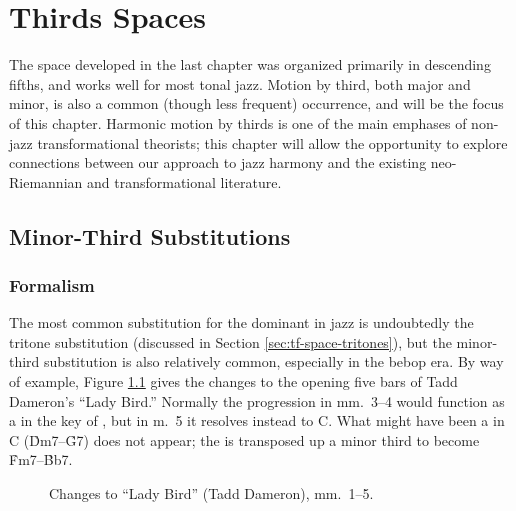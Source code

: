 
\chapter{Thirds Spaces}
\label{chap:thirds-spaces}
\addtocspace

The space developed in the last chapter was organized primarily in descending
fifths, and works well for most tonal jazz. Motion by third, both major and
minor, is also a common (though less frequent) occurrence, and will be the
focus of this chapter. Harmonic motion by thirds is one of the main
emphases of non-jazz transformational theorists; this chapter will allow the
opportunity to explore connections between our approach to jazz harmony and
the existing neo-Riemannian and transformational literature.

\section{Minor-Third Substitutions}
\label{sec:minor-third-subst}

\subsection{Formalism}
\label{sec:m3-formalism}

The most common substitution for the dominant in jazz is undoubtedly the
tritone substitution (discussed in Section \ref{sec:tf-space-tritones}), but
the minor-third substitution is also relatively common, especially in the
bebop era. By way of example, Figure \ref{mts:ladybird-changes} gives the
changes to the opening five bars of Tadd Dameron's ``Lady Bird.'' Normally the
progression in mm.~3--4 would function as a \tf in the key of \Eflat, but in
m.~5 it resolves instead to C. What might have been a \tfo in C
(\h{Dm7}--\h{G7}) does not appear; the \tf is transposed up a minor third to
become \h{Fm7}--\h{Bb7}.

\begin{figure}[tbp]
  \caption{Changes to ``Lady Bird'' (Tadd Dameron), mm.~1--5.}
  \label{mts:ladybird-changes}
\end{figure}

